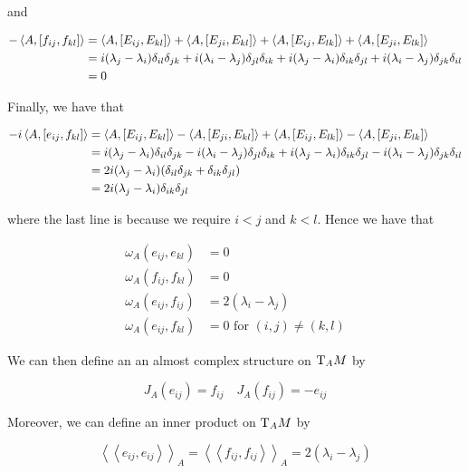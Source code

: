 \documentclass{article}
\newcommand{\iinner}[1]{\left\langle\!\left\langle #1 \right\rangle\!\right\rangle}
\begin{document}
and

\begin{align*}
    -\left\langle A, [f_{ij}, f_{kl}] \right\rangle &= \left\langle A, [E_{ij}, E_{kl}] \right\rangle + \left\langle A, [E_{ji}, E_{kl}] \right\rangle + \left\langle A, [E_{ij}, E_{lk}] \right\rangle + \left\langle A, [E_{ji}, E_{lk}] \right\rangle \\
    &= i(\lambda_j - \lambda_i)\delta_{il}\delta_{jk} + i(\lambda_i - \lambda_j)\delta_{jl}\delta_{ik} + i(\lambda_j - \lambda_i)\delta_{ik}\delta_{jl} + i(\lambda_i - \lambda_j)\delta_{jk}\delta_{il} \\
    &= 0
\end{align*}

Finally, we have that

\begin{align*}
    -i\left\langle A, [e_{ij}, f_{kl}] \right\rangle &= \left\langle A, [E_{ij}, E_{kl}] \right\rangle - \left\langle A, [E_{ji}, E_{kl}] \right\rangle + \left\langle A, [E_{ij}, E_{lk}] \right\rangle - \left\langle A, [E_{ji}, E_{lk}] \right\rangle \\
    &= i(\lambda_j - \lambda_i)\delta_{il}\delta_{jk} - i(\lambda_i - \lambda_j)\delta_{jl}\delta_{ik} + i(\lambda_j - \lambda_i)\delta_{ik}\delta_{jl} - i(\lambda_i - \lambda_j)\delta_{jk}\delta_{il} \\
    &= 2i(\lambda_j - \lambda_i)(\delta_{il}\delta_{jk} + \delta_{ik}\delta_{jl}) \\
    &= 2i(\lambda_j - \lambda_i)\delta_{ik}\delta_{jl}
\end{align*}

where the last line is because we require \(i < j\) and \(k < l\). Hence we have that

\begin{align*}
    \omega_A(e_{ij}, e_{kl}) &= 0 \\
    \omega_A(f_{ij}, f_{kl}) &= 0 \\
    \omega_A(e_{ij}, f_{ij}) &= 2(\lambda_i - \lambda_j) \\
    \omega_A(e_{ij}, f_{kl}) &= 0 \text{ for }(i, j) \ne (k, l)
\end{align*}

We can then define an an almost complex structure on \(\mathrm{T}_AM\) by

\begin{equation}
    \label{eq:cx-str-vector}
    J_A(e_{ij}) = f_{ij} \quad J_A(f_{ij}) = -e_{ij}
\end{equation}

Moreover, we can define an inner product on \(\mathrm{T}_AM\) by

\[\iinner{e_{ij}, e_{ij}}_A = \iinner{f_{ij}, f_{ij}}_A = 2(\lambda_i - \lambda_j)\]
\end{document}
